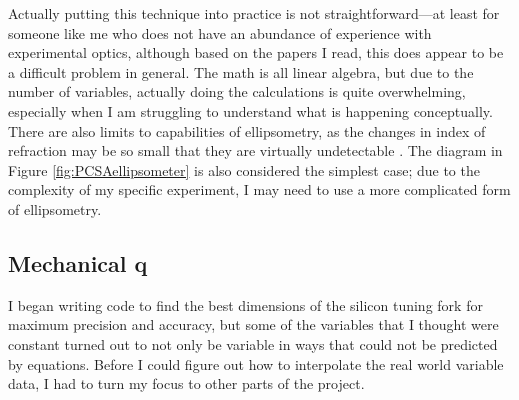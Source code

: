\documentclass[colorlinks=true,pdfstartview=FitV,linkcolor=blue,
            citecolor=red,urlcolor=magenta]{ligodoc}
\begin{document}
\begin{appendices}
Actually putting this technique into practice is not straightforward---at least for someone like me who does not have an abundance of experience with experimental optics, although based on the papers I read, this does appear to be a difficult problem in general. The math is all linear algebra, but due to the number of variables, actually doing the calculations is quite overwhelming, especially when I am struggling to understand what is happening conceptually. There are also limits to capabilities of ellipsometry, as the changes in index of refraction may be so small that they are virtually undetectable \cite{Kalkowski}. The diagram in Figure \ref{fig:PCSAellipsometer} is also considered the simplest case; due to the complexity of my specific experiment, I may need to use a more complicated form of ellipsometry.

\subsection{Mechanical q}

I began writing code to find the best dimensions of the silicon tuning fork for maximum precision and accuracy, but some of the variables that I thought were constant turned out to not only be variable in ways that could not be predicted by equations. Before I could figure out how to interpolate the real world variable data, I had to turn my focus to other parts of the project.

\end{appendices}
\end{document}
